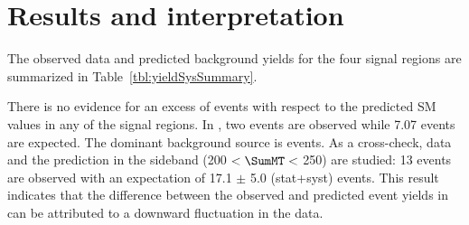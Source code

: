 \section{Results and interpretation}
\label{sect:stat}
The observed data and predicted background yields for the four signal regions are summarized in Table~\ref{tbl:yieldSysSummary}. 

There is no evidence for an excess of events with respect to the predicted SM values in any of the signal regions. In \bintwo, two events are observed while 7.07 events are expected. The dominant background source is \wjets events. As a cross-check, data and the prediction in the sideband (200 $< \SumMT <$ 250\GeV) are studied: 13 events are observed with an expectation of 17.1 $\pm$ 5.0 (stat+syst) events. 
This result indicates that the difference between the observed and predicted event yields in \bintwo can be attributed to a downward fluctuation in the data.

